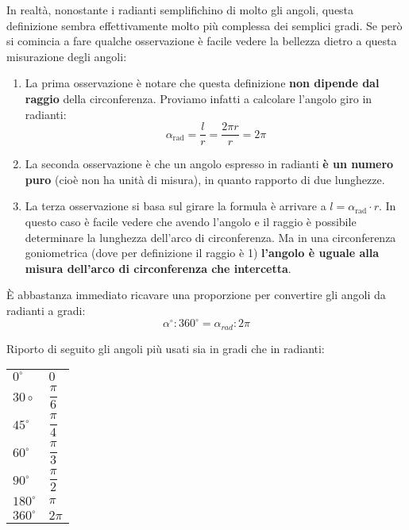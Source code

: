 In realtà, nonostante i radianti semplifichino di molto gli angoli, questa definizione sembra effettivamente molto più complessa dei semplici gradi. Se però si comincia a fare qualche osservazione è facile vedere la bellezza dietro a questa misurazione degli angoli:
\begin{enumerate}
    \item La prima osservazione è notare che questa definizione \textbf{non dipende dal raggio} della circonferenza. Proviamo infatti a calcolare l'angolo giro in radianti:
        \begin{equation*}
            \alpha_{\mathrm{rad}} = \dfrac{l}{r} = \dfrac{2\pi r}{r} = 2\pi
        \end{equation*}
        
    \item La seconda osservazione è che un angolo espresso in radianti \textbf{è un numero puro} (cioè non ha unità di misura), in quanto rapporto di due lunghezze.
    
    \item La terza osservazione si basa sul girare la formula è arrivare a $l = \alpha_\mathrm{rad}\cdot r$. In questo caso è facile vedere che avendo l'angolo e il raggio è possibile determinare la lunghezza dell'arco di circonferenza. Ma in una circonferenza goniometrica (dove per definizione il raggio è 1) \textbf{l'angolo è uguale alla misura dell'arco di circonferenza che intercetta}.
\end{enumerate}
È abbastanza immediato ricavare una proporzione per convertire gli angoli da radianti a gradi:
\begin{equation*}
	\alpha^\circ : 360^\circ = \alpha_{rad} : 2\pi
\end{equation*}

Riporto di seguito gli angoli più usati sia in gradi che in radianti:
\begin{table}[H]
\centering
\bgroup
\def\arraystretch{2}%
\begin{tabular}{l|l}
$0^\circ$                                  & $0$             \\
$30\circ$                                  & $\dfrac{\pi}{6}$ \\
$45^\circ$                                 & $\dfrac{\pi}{4}$ \\
$60^\circ$                                 & $\dfrac{\pi}{3}$ \\
$90^\circ$                                 & $\dfrac{\pi}{2}$ \\
$180^\circ$                                & $\pi$           \\
$360^\circ$                                & $2\pi$         
\end{tabular}
\egroup
\end{table}

